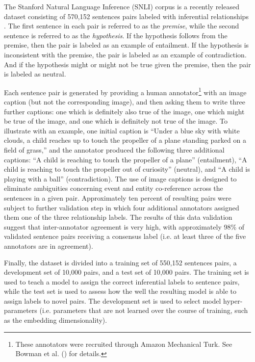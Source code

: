 The Stanford Natural Language Inference (SNLI) corpus is a recently released dataset consisting of 570,152 sentences pairs labeled with inferential relationships \citep{Bowman:2015}. The first sentence in each pair is referred to as the \textit{premise}, while the second sentence is referred to as the \textit{hypothesis}. If the hypothesis follows from the premise, then the pair is labeled as an example of entailment. If the hypothesis is inconsistent with the premise, the pair is labeled as an example of contradiction. And if the hypothesis might or might not be true given the premise, then the pair is labeled as neutral.

Each sentence pair is generated by providing a human annotator\footnote{These annotators were recruited through Amazon Mechanical Turk. See Bowman et al. (\citeyear{Bowman:2015}) for details.} with an image caption (but not the corresponding image), and then asking them to write three further captions: one which is definitely also true of the image, one which might be true of the image, and one which is definitely not true of the image. To illustrate with an example, one initial caption is ``Under a blue sky with white clouds, a child reaches up to touch the propeller of a plane standing parked on a field of grass,'' and the annotator produced the following three additional captions: ``A child is reaching to touch the propeller of a plane'' (entailment), ``A child is reaching to touch the propeller out of curiosity'' (neutral), and ``A child is playing with a ball'' (contradiction). The use of image captions is designed to eliminate ambiguities concerning event and entity co-reference across the sentences in a given pair. Approximately ten percent of resulting pairs were subject to further validation step in which four additional annotators assigned them one of the three relationship labels. The results of this data validation suggest that inter-annotator agreement is very high, with approximately 98\% of validated sentence pairs receiving a consensus label (i.e. at least three of the five annotators are in agreement). 

Finally, the dataset is divided into a training set of 550,152 sentences pairs, a development set of 10,000 pairs, and a test set of 10,000 pairs. The training set is used to teach a model to assign the correct inferential labels to sentence pairs, while the test set is used to assess how the well the resulting model is able to assign labels to novel pairs. The development set is used to select model hyper-parameters (i.e. parameters that are not learned over the course of training, such as the embedding dimensionality). 

